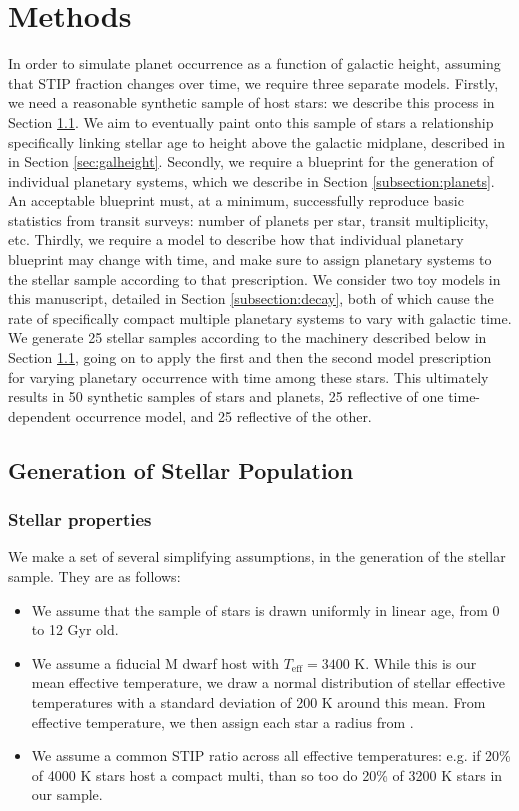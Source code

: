 \documentclass[twocolumn]{aastex631}
\begin{document}
\section{Methods}
\label{sec:Methods}

In order to simulate planet occurrence as a function of galactic height, assuming that STIP fraction changes over time, we require three separate models. Firstly, we need a reasonable synthetic sample of host stars: we describe this process in Section \ref{sec:stellar}. We aim to eventually paint onto this sample of stars a relationship specifically linking stellar age to height above the galactic midplane, described in in Section \ref{sec:galheight}. Secondly, we require a blueprint for the generation of individual planetary systems, which we describe in Section \ref{subsection:planets}. An acceptable blueprint must, at a minimum, successfully reproduce basic statistics from transit surveys: number of planets per star, transit multiplicity, etc. Thirdly, we require a model to describe how that individual planetary blueprint may change with time, and make sure to assign planetary systems to the stellar sample according to that prescription. We consider two toy models in this manuscript, detailed in Section \ref{subsection:decay}, both of which cause the rate of specifically compact multiple planetary systems to vary with galactic time. We generate 25 stellar samples according to the machinery described below in Section \ref{sec:stellar}, going on to apply the first and then the second model prescription for varying planetary occurrence with time among these stars. This ultimately results in 50 synthetic samples of stars and planets, 25 reflective of one time-dependent occurrence model, and 25 reflective of the other. 

\subsection{Generation of Stellar Population}
\label{sec:stellar}

\subsubsection{Stellar properties}

We make a set of several simplifying assumptions, in the generation of the stellar sample. They are as follows:

\begin{itemize}
    \item We assume that the sample of stars is drawn uniformly in linear age, from 0 to 12 Gyr old. 
    \item We assume a fiducial M dwarf host with $T_{\textrm{eff}}=3400$ K. While this is our mean effective temperature, we draw a normal distribution of stellar effective temperatures with a standard deviation of 200 K around this mean. From effective temperature, we then assign each star a radius from \cite{Boyajian12}. 
    \item We assume a common STIP ratio across all effective temperatures: e.g. if 20\% of 4000 K stars host a compact multi, than so too do 20\% of 3200 K stars in our sample.  
\end{itemize}
 
\end{document}
